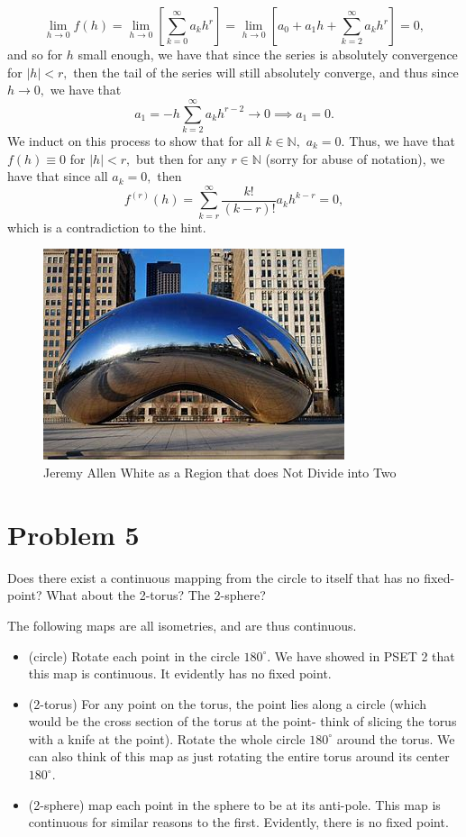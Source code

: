\documentclass[11pt]{article}
\newcommand{\bbN}{\mathbb{N}}
\begin{document}
\begin{enumerate}
\begin{solution}
    \[\lim_{h\to 0}f(h) = \lim_{h\to 0}\left[\sum_{k=0}^\infty a_k h^r\right] = \lim_{h\to 0}\left[a_0 + a_1h + \sum_{k=2}^\infty a_k h^r\right] = 0,\] and so for $h$ small enough, we have that since the series is absolutely convergence for $|h|<r,$ then the tail of the series will still absolutely converge, and thus since $h \to 0,$ we have that
    \[a_1 = -h\sum_{k=2}^\infty a_k h^{r-2} \to 0 \implies a_1 = 0.\] We induct on this process to show that for all $k \in \bbN,$ $a_k = 0.$ Thus, we have that $f(h) \equiv 0$ for $|h|<r,$ but then for any $r \in \bbN$ (sorry for abuse of notation), we have that since all $a_k = 0,$ then
    \[f^{(r)}(h) = \sum_{k=r}^\infty \frac{k!}{(k-r)!}a_k h^{k-r} = 0,\] which is a contradiction to the hint.
\end{solution}
\begin{figure}[h!]
    \centering
    \includegraphics[width=0.5\linewidth]{Images/7.4.png}
    \caption{Jeremy Allen White as a Region that does Not Divide into Two}
\end{figure}
\begin{problem}
    
\end{problem}
\end{enumerate}


\newpage
\section*{Problem 5}
\begin{problem}
    Does there exist a continuous mapping from the circle to itself that has no
 fixed-point? What about the 2-torus? The 2-sphere?
\end{problem}
\begin{solution}
The following maps are all isometries, and are thus continuous.
    \begin{itemize}
        \item (circle) Rotate each point in the circle $180^\circ.$ We have showed in PSET 2 that this map is continuous. It evidently has no fixed point.
        \item (2-torus) For any point on the torus, the point lies along a circle (which would be the cross section of the torus at the point- think of slicing the torus with a knife at the point). Rotate the whole circle $180^\circ$ around the torus. We can also think of this map as just rotating the entire torus around its center $180^\circ.$ 
        \item (2-sphere) map each point in the sphere to be at its anti-pole. This map is continuous for similar reasons to the first. Evidently, there is no fixed point. 
    \end{itemize}
\end{solution}
\end{document}

